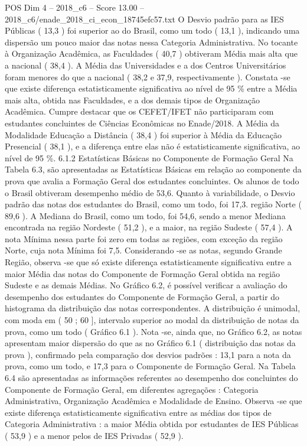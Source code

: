 \begin{textsample}{POS Dim 4 – 2018\_c6 – Score 13.00 – 2018\_c6/enade\_2018\_ci\_econ\_18745efc57.txt}
O Desvio padrão para as IES Públicas ( 13,3 ) foi superior ao do Brasil, como um todo ( 13,1 ), indicando uma dispersão um pouco maior das notas nessa Categoria Administrativa.
No tocante à Organização Acadêmica, as Faculdades ( 40,7 ) obtiveram Média mais alta que a nacional ( 38,4 ).
A Média das Universidades e a dos Centros Universitários foram menores do que a nacional ( 38,2 e 37,9, respectivamente ).
Constata -se que existe diferença estatisticamente significativa ao nível de 95 \% entre a Média mais alta, obtida nas Faculdades, e a dos demais tipos de Organização Acadêmica.
Cumpre destacar que os CEFET/IFET não participaram com estudantes concluintes de Ciências Econômicas no Enade/2018.
A Média da Modalidade Educação a Distância ( 38,4 ) foi superior à Média da Educação Presencial ( 38,1 ), e a diferença entre elas não é estatisticamente significativa, ao nível de 95 \%. 6.1.2 Estatísticas Básicas no Componente de Formação Geral Na Tabela 6.3, são apresentadas as Estatísticas Básicas em relação ao componente da prova que avalia a Formação Geral dos estudantes concluintes.
Os alunos de todo o Brasil obtiveram desempenho médio de 53,6.
Quanto à variabilidade, o Desvio padrão das notas dos estudantes do Brasil, como um todo, foi 17,3. região Norte ( 89,6 ).
A Mediana do Brasil, como um todo, foi 54,6, sendo a menor Mediana encontrada na região Nordeste ( 51,2 ), e a maior, na região Sudeste ( 57,4 ).
A nota Mínima nessa parte foi zero em todas as regiões, com exceção da região Norte, cuja nota Mínima foi 7,5.
Considerando -se as notas, segundo Grande Região, observa -se que só existe diferença estatisticamente significativa entre a maior Média das notas do Componente de Formação Geral obtida na região Sudeste e as demais Médias.
No Gráfico 6.2, é possível verificar a avaliação do desempenho dos estudantes do Componente de Formação Geral, a partir do histograma da distribuição das notas correspondentes.
A distribuição é unimodal, com moda em ( 50 ; 60 ], intervalo superior ao modal da distribuição de notas da prova, como um todo ( Gráfico 6.1 ).
Nota -se, ainda que, no Gráfico 6.2, as notas apresentam maior dispersão do que as no Gráfico 6.1 ( distribuição das notas da prova ), confirmado pela comparação dos desvios padrões : 13,1 para a nota da prova, como um todo, e 17,3 para o Componente de Formação Geral.
Na Tabela 6.4 são apresentadas as informações referentes ao desempenho dos concluintes do Componente de Formação Geral, em diferentes agregações : Categoria Administrativa, Organização Acadêmica e Modalidade de Ensino.
Observa -se que existe diferença estatisticamente significativa entre as médias dos tipos de Categoria Administrativa : a maior Média obtida por estudantes de IES Públicas ( 53,9 ) e a menor pelos de IES Privadas ( 52,9 ).

\end{textsample}
